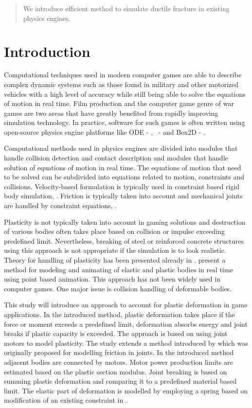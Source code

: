 \begin{abstract}
We introduce efficient method to simulate ductile fracture in existing physics engines.
\end{abstract}

\section{Introduction}

Computational techniques used in modern computer games are able to describe
complex dynamic systems such as those found in military and other motorized vehicles
with a high level of accuracy while still being able to solve the equations of motion in real time.
Film production and the computer game genre of war games
are two areas that have greatly benefited from rapidly improving simulation technology. 
In practice, software for such games is often written using open-source physics engine platforms  
like ODE - \cite{ode}, \cbullet\ - \cite{bullet} and Box2D - \cite{box2d}.

Computational methods used in physics engines are divided into modules that handle collision detection and 
contact description and modules that handle solution of equations of motion in real time. 
The equations of motion that need to be 
solved can be subdivided into equations related to motion, constraints and collisions. 
Velocity-based formulation is typically used in constraint based rigid body simulation, \cite{erleben.thesis}. 
Friction is typically taken into account and mechanical joints are handled by constraint equations,
\cite{erleben.thesis}.

Plasticity is not typically taken into account in gaming solutions and 
destruction of various bodies often takes place based on collision or impulse exceeding predefined limit.
Nevertheless, breaking of steel or reinforced concrete structures using this approach 
is not appropriate if the simulation is to look realistic. Theory for handling of plasticity 
has been presented already in \cite{cg1988}. \cite{muller2005meshless} 
present a method for modeling and animating of elastic and plastic bodies in real time using 
point based animation. This approach has not been widely used in computer games.  
One major issue is collision handling of deformable bodies.

This study will introduce an approach to account for plastic deformation in game applications.   
In the introduced method, plastic deformation takes place if the force or moment exceeds a predefined 
limit, deformation absorbs energy and joint breaks if plastic capacity is exceeded. 
The approach is based on using joint motors to model plasticity. 
The study extends a method introduced by
\cite{erleben.thesis} 
which was originally proposed for modelling friction in joints. 
In the introduced method adjacent bodies are connected by motors. 
Motor power production limits are estimated based on the plastic section modulus. 
Joint breaking is based on summing plastic deformation and comparing it to a
predefined material based limit. The elastic part of deformation is modelled by employing 
a spring based on modification of an existing constraint in \cbullet.


